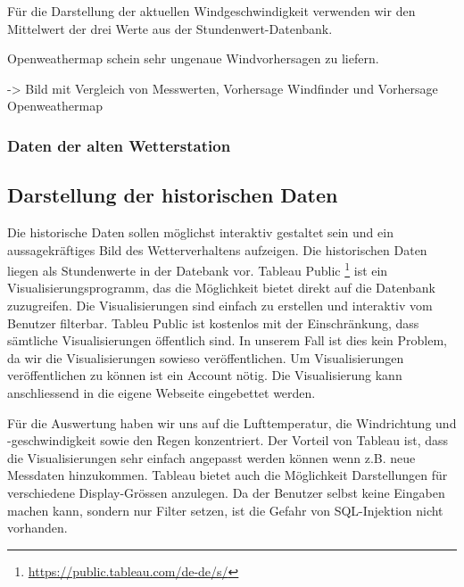 Für die Darstellung der aktuellen Windgeschwindigkeit verwenden wir den Mittelwert der drei Werte aus der Stundenwert-Datenbank.

Openweathermap schein sehr ungenaue Windvorhersagen zu liefern.

-> Bild mit Vergleich von Messwerten, Vorhersage Windfinder und Vorhersage Openweathermap


\subsubsection{Daten der alten Wetterstation}
\newline
{}\newline


\subsection{Darstellung der historischen Daten}
\newline
{}\newline

Die historische Daten sollen möglichst interaktiv gestaltet sein und ein aussagekräftiges Bild des Wetterverhaltens aufzeigen. Die historischen Daten liegen als Stundenwerte in der Datebank vor.
Tableau Public \footnote{ \url{https://public.tableau.com/de-de/s/}} ist ein Visualisierungsprogramm, das die Möglichkeit bietet direkt auf die Datenbank zuzugreifen. Die Visualisierungen sind einfach zu erstellen und interaktiv vom Benutzer filterbar.
Tableu Public ist kostenlos mit der Einschränkung, dass sämtliche Visualisierungen öffentlich sind. In unserem Fall ist dies kein Problem, da wir die Visualisierungen sowieso veröffentlichen. Um Visualisierungen veröffentlichen zu können ist ein Account nötig. Die Visualisierung kann anschliessend in die eigene Webseite eingebettet werden.

Für die Auswertung haben wir uns auf die Lufttemperatur, die Windrichtung und -geschwindigkeit sowie den Regen konzentriert.
Der Vorteil von Tableau ist, dass die Visualisierungen sehr einfach angepasst werden können wenn z.B. neue Messdaten hinzukommen. Tableau bietet auch die Möglichkeit Darstellungen für verschiedene Display-Grössen anzulegen. Da der Benutzer selbst keine Eingaben machen kann, sondern nur Filter setzen, ist die Gefahr von SQL-Injektion nicht vorhanden.

